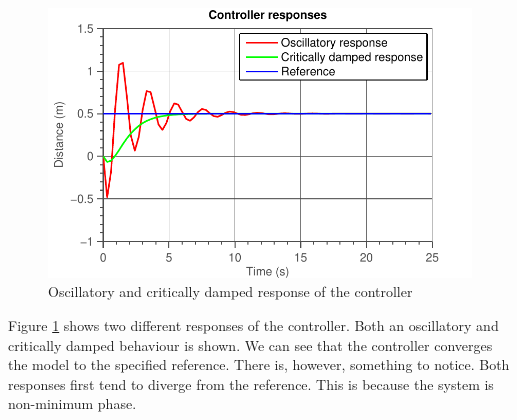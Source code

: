 \documentclass[11pt,titlepage]{report}
\begin{document}
\begin{figure}[H]
	\begin{center}
		\includegraphics[width=0.7\linewidth]{resource/controller.pdf}
	\end{center}
	\caption{Oscillatory and critically damped response of the controller}
	\label{fig:ass-2-controller-response}
\end{figure}

Figure \ref{fig:ass-2-controller-response} shows two different responses of the controller. Both an oscillatory and critically damped behaviour is shown. We can see that the controller converges the model to the specified reference. There is, however, something to notice. Both responses first tend to diverge from the reference. This is because the system is non-minimum phase.
\end{document}
